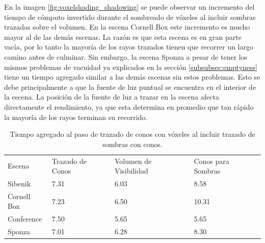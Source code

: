 En la imagen \ref{fig:voxelshading_shadowing} se puede observar un incremento del tiempo de cómputo invertido durante el sombreado de vóxeles al incluir sombras trazadas sobre el volumen. En la escena Cornell Box este incremento es mucho mayor al de las demás escenas. La razón es que esta escena es en gran parte vacía, por lo tanto la mayoría de los rayos trazados tienen que recorrer un largo camino antes de culminar. Sin embargo, la escena Sponza a pesar de tener los mismos problemas de vacuidad ya explicados en la sección \ref{subsubsec:emptyness} tiene un tiempo agregado similar a las demás escenas sin estos problemas. Esto se debe principalmente a que la fuente de luz puntual se encuentra en el interior de la escena. La posición de la fuente de luz a trazar en la escena afecta directamente el rendimiento, ya que esta determina en promedio que tan rápido la mayoría de los rayos terminan su recorrido.

\begin{table}[H]
\centering
\begin{tabular}{llll}
                                  &                                       &                                             &                                         \\ \hline
\multicolumn{1}{|l|}{Escena}      & \multicolumn{1}{l|}{Trazado de Conos} & \multicolumn{1}{l|}{Volumen de Visibilidad} & \multicolumn{1}{l|}{Conos para Sombras} \\ \hline
\multicolumn{1}{|l|}{Sibenik}     & \multicolumn{1}{l|}{7.31}             & \multicolumn{1}{l|}{6.03}                   & \multicolumn{1}{l|}{8.58}               \\
\multicolumn{1}{|l|}{Cornell Box} & \multicolumn{1}{l|}{7.23}             & \multicolumn{1}{l|}{6.50}                   & \multicolumn{1}{l|}{10.31}              \\
\multicolumn{1}{|l|}{Conference}  & \multicolumn{1}{l|}{7.50}             & \multicolumn{1}{l|}{5.65}                   & \multicolumn{1}{l|}{5.65}               \\
\multicolumn{1}{|l|}{Sponza}      & \multicolumn{1}{l|}{7.01}             & \multicolumn{1}{l|}{6.28}                   & \multicolumn{1}{l|}{8.30}               \\ \hline
\end{tabular}
\caption{Tiempo agregado al paso de trazado de conos con vóxeles al incluir trazado de sombras con conos.}
\label{tab:shadowcone5}
\end{table}

